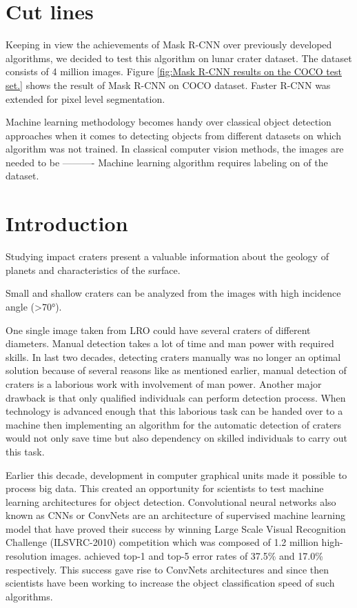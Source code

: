 \documentclass[11pt]{article}
\begin{document}
\section{Cut lines}
Keeping in view the achievements of Mask R-CNN over previously developed algorithms, we decided to test this algorithm on lunar crater dataset. The dataset consists of 4 million images. Figure \ref{fig:Mask R-CNN results on the COCO test set.} shows the result of Mask R-CNN on COCO dataset. Faster R-CNN was extended for pixel level segmentation.

\par
Machine learning methodology becomes handy over classical object detection approaches when it comes to detecting objects from different datasets on which algorithm was not trained. In classical computer vision methods, the images are needed to be ---------- Machine learning algorithm requires labeling on of the dataset. 


\section{Introduction}
Studying impact craters present a valuable information about the geology of planets and characteristics of the surface.

\par
 Small and shallow craters can be analyzed from the images with high incidence angle (\textgreater70°).

\par
One single image taken from LRO could have several craters of different diameters. Manual detection takes a lot of time and man power with required skills. In last two decades, detecting craters manually was no longer an optimal solution because of several reasons like as mentioned earlier, manual detection of craters is a laborious work with involvement of man power. Another major drawback is that only qualified individuals can perform detection process. When technology is advanced enough that this laborious task can be handed over to a machine then implementing an algorithm for the automatic detection of craters would not only save time but also dependency on skilled individuals to carry out this task. 

\par
Earlier this decade, development in computer graphical units made it possible to process big data. This created an opportunity for scientists to test machine learning architectures for object detection. Convolutional neural networks also known as CNNs or ConvNets are an architecture of supervised machine learning model that have proved their success by winning Large Scale Visual Recognition Challenge (ILSVRC-2010) competition which was composed of 1.2 million high-resolution images. \cite{krizhevsky_imagenet_2012} achieved top-1 and top-5 error rates of 37.5\% and 17.0\% respectively. This success gave rise to ConvNets architectures and since then scientists have been working to increase the object classification speed of such algorithms.
\end{document}
